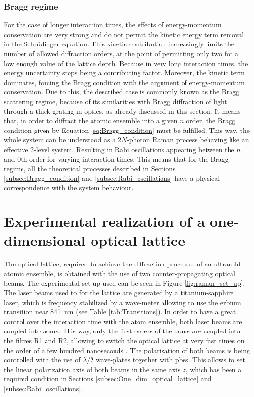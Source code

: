 \subsubsection{Bragg regime}

For the case of longer interaction times, the effects of energy-momentum conservation are very strong and do not permit the kinetic energy term removal in the Schr\"odinger equation. This kinetic contribution increasingly limits the number of allowed diffraction orders, at the point of permitting only two for a low enough value of the lattice depth. Because in very long interaction times, the energy uncertainty stops being a contributing factor. Moreover, the kinetic term dominates, forcing the Bragg condition with the argument of energy-momentum conservation. Due to this, the described case is commonly known as the Bragg scattering regime, because of its similarities with Bragg diffraction of light through a thick grating in optics, as already discussed in this section. It means that, in order to diffract the atomic ensemble into a given $n$ order, the Bragg condition given by Equation \eqref{eq:Bragg_condition} must be fulfilled. This way, the whole system can be understood as a 2$N$-photon Raman process behaving like an effective 2-level system. Resulting in Rabi oscillations appearing between the $n$ and 0th order for varying interaction times. This means that for the Bragg regime, all the theoretical processes described in Sections \ref{subsec:Bragg_condition} and \ref{subsec:Rabi_oscillations} have a physical correspondence with the system behaviour.

\section{Experimental realization of a one-dimensional optical lattice}

The optical lattice, required to achieve the diffraction processes of an ultracold atomic ensemble, is obtained with the use of two counter-propagating optical beams. The experimental set-up used can be seen in Figure \ref{fig:raman_set_up}. The laser beams used to for the lattice are generated by a titanium-sapphire laser, which is frequency stabilized by a wave-meter allowing to use the erbium transition near \SI{841}{\nano\meter} (see Table \ref{tab:Transitions}). In order to have a great control over the interaction time with the atom ensemble, both laser beams are coupled into \acp{aom}. This way, only the first orders of the \acp{aom} are coupled into the fibres R1 and R2, allowing to switch the optical lattice at very fast times on the order of a few hundred nanoseconds \cite{Helten2019}. The polarization of both beams is being controlled with the use of $\lambda/2$ wave-plates together with \acfp{pbs}. This allows to set the linear polarization axis of both beams in the same axis $z$, which has been a required condition in Sections \ref{subsec:One_dim_optical_lattice} and \ref{subsec:Rabi_oscillations}. %

